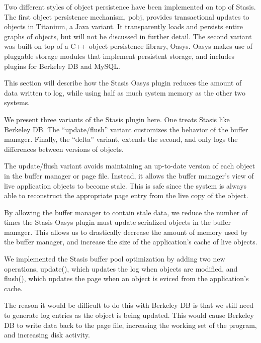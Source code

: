 \documentclass[letterpaper,twocolumn,10pt]{article}
\newcommand{\yad}{Stasis\xspace}
\newcommand{\yads}{Stasis'\xspace}
\newcommand{\oasys}{Oasys\xspace}
\begin{document}
Two different styles of object persistence have been implemented
on top of \yad.
%
The first object persistence mechanism, pobj, provides transactional updates to objects in
Titanium, a Java variant.  It transparently loads and persists
entire graphs of objects, but will not be discussed in further detail.
The second variant was built on top of a C++ object
persistence library, \oasys.  \oasys makes use of pluggable storage
modules that implement persistent storage, and includes plugins
for Berkeley DB and MySQL.  

This section will describe how the \yad \oasys plugin reduces the
amount of data written to log, while using half as much system memory
as the other two systems.

We present three variants of the \yad plugin here.  One treats
\yad like Berkeley DB.  The ``update/flush'' variant
customizes the behavior of the buffer manager. Finally, the 
``delta'' variant, extends the second, and only logs the differences
between versions of objects.

The update/flush variant avoids maintaining an up-to-date
version of each object in the buffer manager or page file.  Instead, it allows
the buffer manager's view of live application objects to become stale.
This is safe since the system is always able to reconstruct the
appropriate page entry from the live copy of the object.

By allowing the buffer manager to contain stale data, we reduce the
number of times the \yad \oasys plugin must update serialized objects in the buffer manager.
This allows us to drastically decrease the
amount of memory used by the buffer manager, and increase the size of
the application's cache of live objects.

We implemented the \yad buffer pool optimization by adding two new
operations, update(), which updates the log when objects are modified, and flush(), which
updates the page when an object is eviced from the application's cache.  

The reason it would be difficult to do this with Berkeley DB is that
we still need to generate log entries as the object is being updated.
  This would cause Berkeley DB to write data back to the page file,
increasing the working set of the program, and increasing disk
activity.
\end{document}
